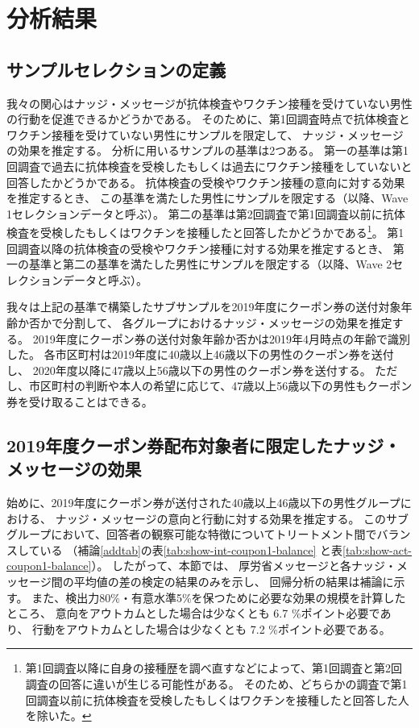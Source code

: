 \documentclass[
  11pt,
  a4paper,
]{article}
\begin{document}
\hypertarget{result}{%
\section{分析結果}\label{result}}

\hypertarget{selection}{%
\subsection{サンプルセレクションの定義}\label{selection}}

我々の関心はナッジ・メッセージが抗体検査やワクチン接種を受けていない男性の行動を促進できるかどうかである。
そのために、第1回調査時点で抗体検査とワクチン接種を受けていない男性にサンプルを限定して、
ナッジ・メッセージの効果を推定する。
分析に用いるサンプルの基準は2つある。
第一の基準は第1回調査で過去に抗体検査を受検したもしくは過去にワクチン接種をしていないと回答したかどうかである。
抗体検査の受検やワクチン接種の意向に対する効果を推定するとき、
この基準を満たした男性にサンプルを限定する（以降、Wave 1セレクションデータと呼ぶ）。
第二の基準は第2回調査で第1回調査以前に抗体検査を受検したもしくはワクチンを接種したと回答したかどうかである\footnote{第1回調査以降に自身の接種歴を調べ直すなどによって、第1回調査と第2回調査の回答に違いが生じる可能性がある。
  そのため、どちらかの調査で第1回調査以前に抗体検査を受検したもしくはワクチンを接種したと回答した人を除いた。}。
第1回調査以降の抗体検査の受検やワクチン接種に対する効果を推定するとき、
第一の基準と第二の基準を満たした男性にサンプルを限定する（以降、Wave 2セレクションデータと呼ぶ）。

我々は上記の基準で構築したサブサンプルを2019年度にクーポン券の送付対象年齢か否かで分割して、
各グループにおけるナッジ・メッセージの効果を推定する。
2019年度にクーポン券の送付対象年齢か否かは2019年4月時点の年齢で識別した。
各市区町村は2019年度に40歳以上46歳以下の男性のクーポン券を送付し、
2020年度以降に47歳以上56歳以下の男性のクーポン券を送付する。
ただし、市区町村の判断や本人の希望に応じて、47歳以上56歳以下の男性もクーポン券を受け取ることはできる。

\hypertarget{coupon1}{%
\subsection{2019年度クーポン券配布対象者に限定したナッジ・メッセージの効果}\label{coupon1}}

始めに、2019年度にクーポン券が送付された40歳以上46歳以下の男性グループにおける、
ナッジ・メッセージの意向と行動に対する効果を推定する。
このサブグループにおいて、回答者の観察可能な特徴についてトリートメント間でバランスしている
（補論\ref{addtab}の表\ref{tab:show-int-coupon1-balance}
と表\ref{tab:show-act-coupon1-balance}）。
したがって、本節では、
厚労省メッセージと各ナッジ・メッセージ間の平均値の差の検定の結果のみを示し、
回帰分析の結果は補論に示す。
また、検出力80\%・有意水準5\%を保つために必要な効果の規模を計算したところ、
意向をアウトカムとした場合は少なくとも
6.7
\%ポイント必要であり、
行動をアウトカムとした場合は少なくとも
7.2
\%ポイント必要である。
\end{document}
